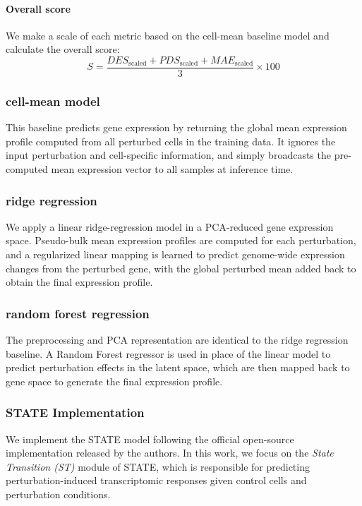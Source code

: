 \documentclass[conference]{IEEEtran}
\begin{document}
\paragraph{Overall score}
We make a scale of each metric based on the cell-mean baseline model and calculate the overall score:
$$
S = \frac{DES_\text{scaled} + PDS_\text{scaled} + MAE_\text{scaled}}{3} \times 100
$$


\subsubsection{cell-mean model}
This baseline predicts gene expression by returning the global mean expression profile computed from all perturbed cells in the training data. It ignores the input perturbation and cell-specific information, and simply broadcasts the pre-computed mean expression vector to all samples at inference time.

\subsubsection{ridge regression}
We apply a linear ridge-regression model in a PCA-reduced gene expression space. Pseudo-bulk mean expression profiles are computed for each perturbation, and a regularized linear mapping is learned to predict genome-wide expression changes from the perturbed gene, with the global perturbed mean added back to obtain the final expression profile.

\subsubsection{random forest regression}
The preprocessing and PCA representation are identical to the ridge regression baseline. 
A Random Forest regressor is used in place of the linear model to predict perturbation effects in the latent space, which are then mapped back to gene space to generate the final expression profile.


\subsubsection{STATE Implementation}

We implement the STATE model following the official open-source implementation released by the authors.
In this work, we focus on the \textit{State Transition (ST)} module of STATE, which is responsible for predicting
perturbation-induced transcriptomic responses given control cells and perturbation conditions.
\end{document}
